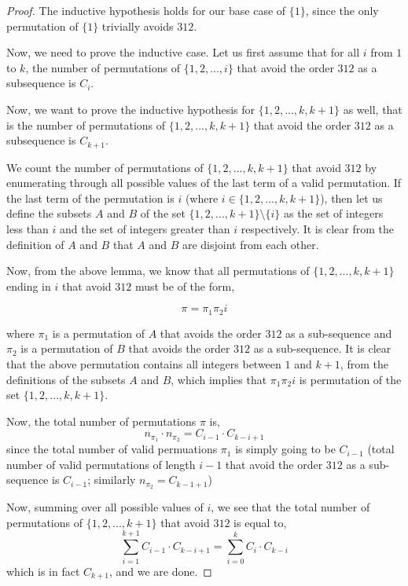 \documentclass[11pt,letterpaper,twoside,english]{article}
\theoremstyle{theorem}
\theoremstyle{remark}
\begin{document}
\begin{proof}
The inductive hypothesis holds for our base case of $\{1\}$, since the only permutation of $\{1\}$ trivially avoids $312$.

Now, we need to prove the inductive case. Let us first assume that for all $i$ from $1$ to $k$, the number of permutations of $\{1,2,...,i\}$ that avoid the order $312$ as a subsequence is $C_i$.

Now, we want to prove the inductive hypothesis for $\{1,2,...,k,k+1\}$ as well, that is the number of permutations of $\{1,2,...,k,k+1\}$ that avoid the order $312$ as a subsequence is $C_{k+1}$.

We count the number of permutations of $\{1,2,...,k,k+1\}$ that avoid $312$ by enumerating through all possible values of the last term of a valid permutation.
If the last term of the permutation is $i$ (where $i \in \{1,2,...,k,k+1\}$), then let us define the subsets $A$ and $B$ of the  set $\{1,2,...,k+1\} \setminus \{i\}$ as the set of integers less than $i$ and the set of integers greater than $i$ respectively. It is clear from the definition of $A$ and $B$ that $A$ and $B$ are disjoint from each other.

Now, from the above lemma, we know that all permutations of $\{1,2,...,k,k+1\}$ ending in $i$ that avoid $312$ must be of the form,

$$\pi = \pi_1 \pi_2 i$$

where $\pi_1$ is a permutation of $A$ that avoids the order $312$ as a sub-sequence and $\pi_2$ is a permutation of $B$ that avoids the order $312$ as a sub-sequence. It is clear that the above permutation contains all integers between $1$ and $k+1$, from the definitions of the subsets $A$ and $B$, which implies that $\pi_1\pi_2i$ is permutation of the set $\{1,2,...,k,k+1\}$.

Now, the total number of permutations $\pi$ is,
$$n_{\pi_1} \cdot n_{\pi_2} = C_{i-1} \cdot C_{k-i+1}$$
since the total number of valid permuations $\pi_1$ is simply going to be $C_{i-1}$ (total number of valid permutations of length $i-1$ that avoid the order $312$ as a sub-sequence is $C_{i-1}$; similarly $n_{\pi_2} = C_{k-1+1}$)

Now, summing over all possible values of $i$, we see that the total number of permutations of $\{1,2,...,k+1\}$ that avoid $312$ is equal to,
$$\sum_{i=1}^{k+1} C_{i-1} \cdot C_{k-i+1} = \sum_{i=0}^k C_i \cdot C_{k-i}$$ which is in fact $C_{k+1}$, and we are done.

\end{proof}
\end{document}
